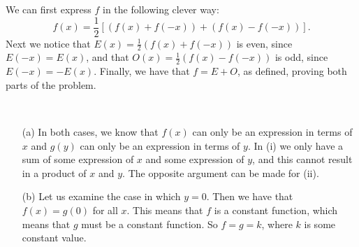 \begin{problem}[3-13]
We can first express $f$ in the following clever way:
\[ f(x) = \frac{1}{2}[(f(x) + f(-x)) + (f(x) - f(-x))]. \]
Next we notice that $E(x) = \frac{1}{2}(f(x) + f(-x))$ is even, since $E(-x) = E(x)$, and that $O(x) = \frac{1}{2}(f(x) - f(-x))$ is odd, since $E(-x) = -E(x)$. Finally, we have that $f = E + O$, as defined, proving both parts of the problem.
\end{problem}

\begin{problem}[3-19] \ 
\begin{enumerate}

\item[(a)]
In both cases, we know that $f(x)$ can only be an expression in terms of $x$ and $g(y)$ can only be an expression in terms of $y$. In (i) we only have a sum of some expression of $x$ and some expression of $y$, and this cannot result in a product of $x$ and $y$. The opposite argument can be made for (ii). 

\item[(b)]
Let us examine the case in which $y = 0$. Then we have that $f(x) = g(0)$ for all $x$. This means that $f$ is a constant function, which means that $g$ must be a constant function. So $f = g = k$, where $k$ is some constant value.
\end{enumerate}
\end{problem}



